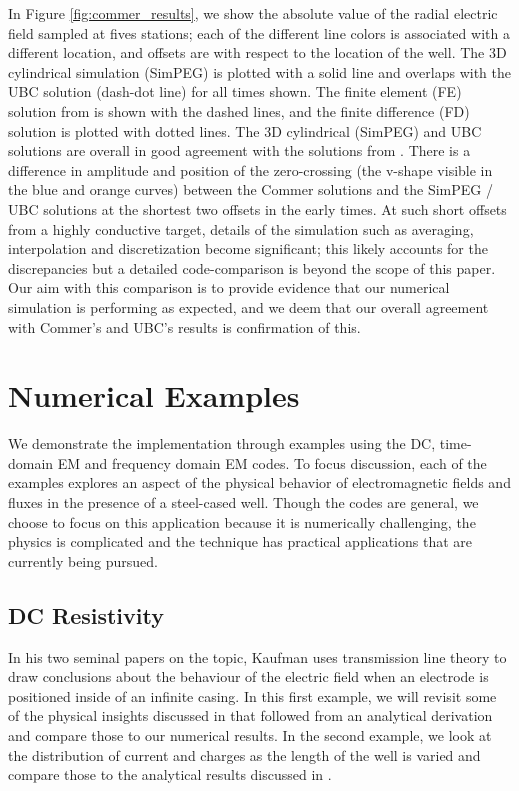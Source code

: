 In Figure \ref{fig:commer_results}, we show the absolute value of the radial electric field sampled at fives stations; each of the different line colors is associated with a different location, and offsets are with respect to the location of the well. The 3D cylindrical simulation (SimPEG) is plotted with a solid line and overlaps with the UBC solution (dash-dot line) for all times shown. The finite element (FE) solution from \cite{Commer2015} is shown with the dashed lines, and the finite difference (FD) solution is plotted with dotted lines. The 3D cylindrical (SimPEG) and UBC solutions are overall in good agreement with the solutions from \cite{Commer2015}. There is a difference in amplitude and position of the zero-crossing (the v-shape visible in the blue and orange curves) between the Commer solutions and the SimPEG / UBC solutions at the shortest two offsets in the early times. At such short offsets from a highly conductive target, details of the simulation such as averaging, interpolation and discretization become significant; this likely accounts for the discrepancies but a detailed code-comparison is beyond the scope of this paper. Our aim with this comparison is to provide evidence that our numerical simulation is performing as expected, and we deem that our overall agreement with Commer’s and UBC’s results is confirmation of this.







\section{Numerical Examples}
\label{sec:numerical_results}

We demonstrate the implementation through examples using the DC, time-domain EM and frequency domain EM codes. To focus discussion, each of the examples explores an aspect of the physical behavior of electromagnetic fields and fluxes in the presence of a steel-cased well. Though the codes are general, we choose to focus on this application because it is numerically challenging, the physics is complicated and the technique has practical applications that are currently being pursued.
\subsection{DC Resistivity}
\label{sec:dc_resistivity}

In his two seminal papers on the topic, Kaufman uses transmission line theory to draw conclusions about the behaviour of the electric field when an electrode is positioned inside of an infinite casing. In this first example, we will revisit some of the physical insights discussed in \citep{Kaufman1990, Kaufman1993} that followed from an analytical derivation and compare those to our numerical results. In the second example, we look at the distribution of current and charges as the length of the well is varied and compare those to the analytical results discussed in \citep{Kaufman1993}.


